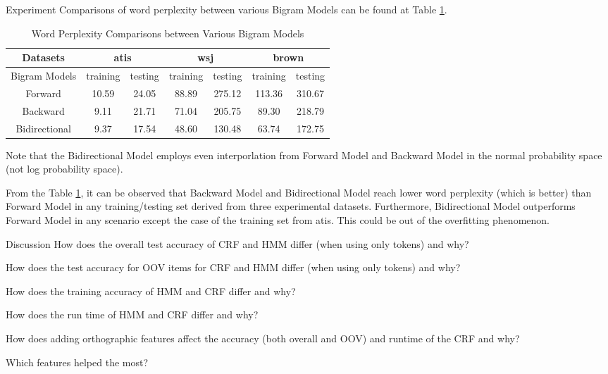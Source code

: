 \documentclass[11pt,a4paper]{article}
\begin{document}
\begin{section}{Experiment}
    Comparisons of word perplexity between various Bigram Models
    can be found at Table \ref{wptable}.  

    \begin{table}[h] \centering
        \caption{Word Perplexity Comparisons between Various Bigram Models}
        \label{wptable}
        \begin{tabular}{|c||c|c||c|c||c|c|}
            \hline
            Datasets  & \multicolumn{2}{|c||}{atis} & \multicolumn{2}{|c||}{wsj} & 
            \multicolumn{2}{|c|}{brown} \\ \hline
            Bigram Models  & training & testing & training & testing  &training & testing  \\ \hline
  Forward & 10.59 & 24.05 & 88.89 & 275.12 & 113.36  & 310.67 \\
  Backward & 9.11 & 21.71 & 71.04 & 205.75 & 89.30 & 218.79 \\
  Bidirectional & 9.37 &  17.54 & 48.60 & 130.48 & 63.74 & 172.75 \\
            \hline
        \end{tabular}
    \end{table}

    Note that the Bidirectional Model employs even interporlation from Forward
    Model and Backward Model in the normal probability space (not log
    probability space).

    From the Table \ref{wptable}, it can be observed that Backward Model and
    Bidirectional Model reach lower word perplexity (which is better) than
    Forward Model in any training/testing set derived from three
    experimental datasets. 
    Furthermore, Bidirectional Model outperforms Forward Model in any
    scenario except the case of the training set from atis. This could be
    out of the overfitting phenomenon.

\end{section}


\begin{section}{Discussion}
How does the overall test accuracy of CRF and HMM differ (when using only tokens) and why?

How does the test accuracy for OOV items for CRF and HMM differ (when using only tokens) and why?

How does the training accuracy of HMM and CRF differ and why?

How does the run time of HMM and CRF differ and why?

How does adding orthographic features affect the accuracy (both overall and OOV) and runtime of the CRF and why?

Which features helped the most? 

\end{section}


\end{document}
